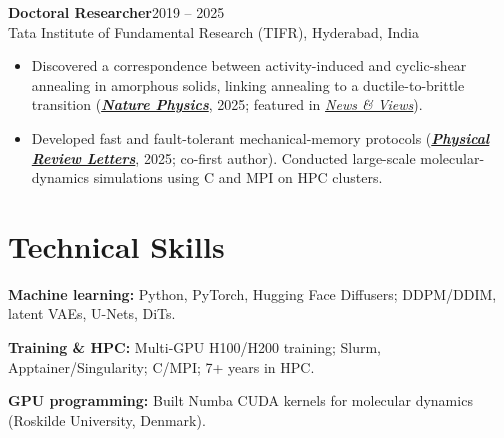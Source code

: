 \documentclass[11pt,letterpaper]{article}
\newcommand{\role}[3]{\textbf{#1}\hfill #2\\#3\par}
\begin{document}
\vspace{11pt}
\role{Doctoral Researcher}{2019 -- 2025}
{Tata Institute of Fundamental Research (TIFR), Hyderabad, India}
\begin{itemize}
\item Discovered a correspondence between activity-induced and cyclic-shear annealing in amorphous
solids, linking annealing to a ductile-to-brittle transition
(\href{https://doi.org/10.1038/s41567-024-02724-5}{\textbf{\textit{Nature Physics}}}, 2025;
featured in \href{https://www.nature.com/articles/s41567-025-02900-1}{\textit{News \& Views}}).
\item Developed fast and fault-tolerant mechanical-memory protocols
(\href{https://doi.org/10.1103/PhysRevLett.134.018202}{\textbf{\textit{Physical Review Letters}}},
2025; co-first author). Conducted large-scale molecular-dynamics simulations using C and MPI
on HPC clusters.
\end{itemize}

\section{Technical Skills}
\textbf{Machine learning:} Python, PyTorch, Hugging Face Diffusers; DDPM/DDIM, latent VAEs, U-Nets, DiTs.\par\vspace{3pt}
\textbf{Training \& HPC:} Multi-GPU H100/H200 training; Slurm, Apptainer/Singularity; C/MPI; 7+ years in HPC.\par\vspace{3pt}
\textbf{GPU programming:} Built Numba CUDA kernels for molecular dynamics (Roskilde University, Denmark).

\newpage
\end{document}
